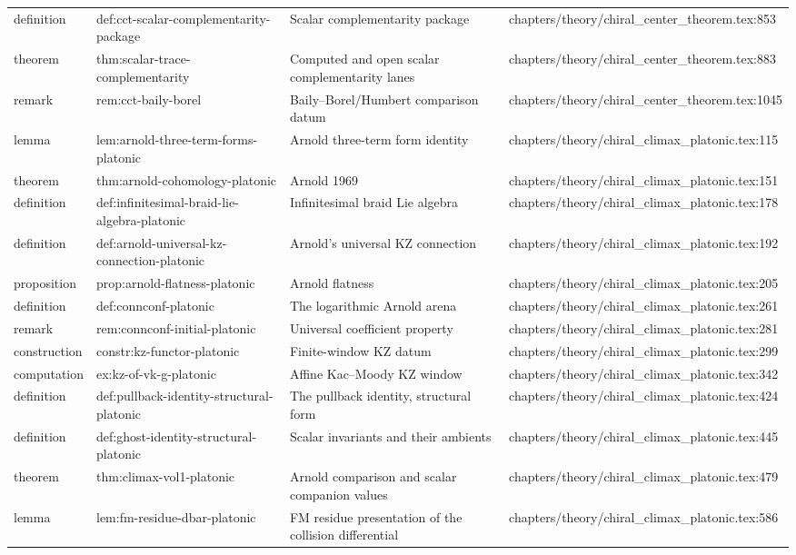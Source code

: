 \documentclass[11pt]{article}
\begin{document}
\begin{longtable}{L{0.10\textwidth}L{0.26\textwidth}L{0.42\textwidth}L{0.22\textwidth}}
definition & def:cct-scalar-complementarity-package & Scalar complementarity package & chapters/theory/chiral\_center\_theorem.tex:853\\
theorem & thm:scalar-trace-complementarity & Computed and op{}en scalar complementarity lanes & chapters/theory/chiral\_center\_theorem.tex:883\\
remark & rem:cct-baily-borel & Baily--Borel/Humbert comparison datum & chapters/theory/chiral\_center\_theorem.tex:1045\\
lemma & lem:arnold-three-term-forms-platonic & Arnold three-term form identity & chapters/theory/chiral\_climax\_platonic.tex:115\\
theorem & thm:arnold-cohomology-platonic & Arnold 1969 & chapters/theory/chiral\_climax\_platonic.tex:151\\
definition & def:infinitesimal-braid-lie-algebra-platonic & Infinitesimal braid Lie algebra & chapters/theory/chiral\_climax\_platonic.tex:178\\
definition & def:arnold-universal-kz-connection-platonic & Arnold's universal KZ connection & chapters/theory/chiral\_climax\_platonic.tex:192\\
proposition & prop:arnold-flatness-platonic & Arnold flatness & chapters/theory/chiral\_climax\_platonic.tex:205\\
definition & def:connconf-platonic & The logarithmic Arnold arena & chapters/theory/chiral\_climax\_platonic.tex:261\\
remark & rem:connconf-initial-platonic & Universal coefficient property & chapters/theory/chiral\_climax\_platonic.tex:281\\
construction & constr:kz-functor-platonic & Finite-window KZ datum & chapters/theory/chiral\_climax\_platonic.tex:299\\
computation & ex:kz-of-vk-g-platonic & Affine Kac--Moody KZ window & chapters/theory/chiral\_climax\_platonic.tex:342\\
definition & def:pullback-identity-structural-platonic & The pullback identity, structural form & chapters/theory/chiral\_climax\_platonic.tex:424\\
definition & def:ghost-identity-structural-platonic & Scalar invariants and their ambients & chapters/theory/chiral\_climax\_platonic.tex:445\\
theorem & thm:climax-vol1-platonic & Arnold comparison and scalar companion values & chapters/theory/chiral\_climax\_platonic.tex:479\\
lemma & lem:fm-residue-dbar-platonic & FM residue presentation of the collision differential & chapters/theory/chiral\_climax\_platonic.tex:586\\

\end{longtable}
\end{document}
